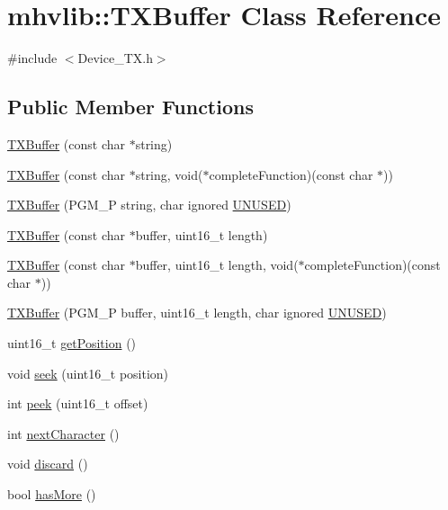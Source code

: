 \hypertarget{classmhvlib_1_1_t_x_buffer}{\section{mhvlib\-:\-:T\-X\-Buffer Class Reference}
\label{classmhvlib_1_1_t_x_buffer}
}


{\ttfamily \#include $<$Device\-\_\-\-T\-X.\-h$>$}

\subsection*{Public Member Functions}
\begin{DoxyCompactItemize}
\item 
\hyperlink{classmhvlib_1_1_t_x_buffer_a3cabb9429216f858ba2614d1b8817576}{T\-X\-Buffer} (const char $\ast$string)
\item 
\hyperlink{classmhvlib_1_1_t_x_buffer_a39ebbd96a1367ed0bb5f0ca93ce6bdb1}{T\-X\-Buffer} (const char $\ast$string, void($\ast$complete\-Function)(const char $\ast$))
\item 
\hyperlink{classmhvlib_1_1_t_x_buffer_a7015a9db34d23bf089c0049acf5526fd}{T\-X\-Buffer} (P\-G\-M\-\_\-\-P string, char ignored \hyperlink{io_8h_addf5ec070e9499d36b7f2009ce736076}{U\-N\-U\-S\-E\-D})
\item 
\hyperlink{classmhvlib_1_1_t_x_buffer_a7d5162768a78458e67ce9017e0e59c9c}{T\-X\-Buffer} (const char $\ast$buffer, uint16\-\_\-t length)
\item 
\hyperlink{classmhvlib_1_1_t_x_buffer_a07ada2e8dd63275ee2dcba91553916d5}{T\-X\-Buffer} (const char $\ast$buffer, uint16\-\_\-t length, void($\ast$complete\-Function)(const char $\ast$))
\item 
\hyperlink{classmhvlib_1_1_t_x_buffer_ac1bd0a2f85e6753472256749ed90fd0f}{T\-X\-Buffer} (P\-G\-M\-\_\-\-P buffer, uint16\-\_\-t length, char ignored \hyperlink{io_8h_addf5ec070e9499d36b7f2009ce736076}{U\-N\-U\-S\-E\-D})
\item 
uint16\-\_\-t \hyperlink{classmhvlib_1_1_t_x_buffer_a8b13e4f9e938f0e1368a9e32e93ba6c2}{get\-Position} ()
\item 
void \hyperlink{classmhvlib_1_1_t_x_buffer_a5fd4b990c919ad5e0ffb4c3a81d79104}{seek} (uint16\-\_\-t position)
\item 
int \hyperlink{classmhvlib_1_1_t_x_buffer_ad77f185a8132f0a821a4746b9154b87e}{peek} (uint16\-\_\-t offset)
\item 
int \hyperlink{classmhvlib_1_1_t_x_buffer_ad90cb89af87736335c0b29d3c2d1bfbe}{next\-Character} ()
\item 
void \hyperlink{classmhvlib_1_1_t_x_buffer_ac42e378b123cf47cb870960664664ec5}{discard} ()
\item 
bool \hyperlink{classmhvlib_1_1_t_x_buffer_aabebd9b616021b3b4f78f55189ad888b}{has\-More} ()
\end{DoxyCompactItemize}
